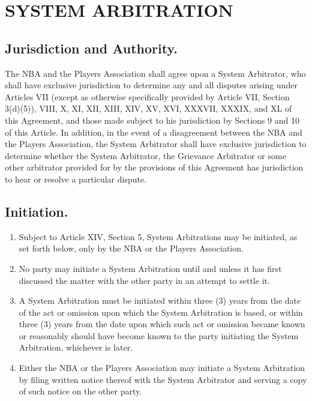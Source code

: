 \documentclass[
]{book}
\providecommand{\tightlist}{%
  \setlength{\itemsep}{0pt}\setlength{\parskip}{0pt}}
\begin{document}
\hypertarget{system-arbitration}{%
\chapter{SYSTEM ARBITRATION}\label{system-arbitration}}

\hypertarget{jurisdiction-and-authority.}{%
\section{Jurisdiction and Authority.}\label{jurisdiction-and-authority.}}

The NBA and the Players Association shall agree upon a System Arbitrator, who shall have exclusive jurisdiction to determine any and all disputes arising under Articles VII (except as otherwise specifically provided by Article VII, Section 3(d)(5)), VIII, X, XI, XII, XIII, XIV, XV, XVI, XXXVII, XXXIX, and XL of this Agreement, and those made subject to his jurisdiction by Sections 9 and 10 of this Article. In addition, in the event of a disagreement between the NBA and the Players Association, the System Arbitrator shall have exclusive jurisdiction to determine whether the System Arbitrator, the Grievance Arbitrator or some other arbitrator provided for by the provisions of this Agreement has jurisdiction to hear or resolve a particular dispute.

\hypertarget{initiation.-1}{%
\section{Initiation.}\label{initiation.-1}}

\begin{enumerate}
\def\labelenumi{(\alph{enumi})}
\tightlist
\item
  Subject to Article XIV, Section 5, System Arbitrations may be initiated, as set forth below, only by the NBA or the Players Association.
\item
  No party may initiate a System Arbitration until and unless it has first discussed the matter with the other party in an attempt to settle it.
\item
  A System Arbitration must be initiated within three (3) years from the date of the act or omission upon which the System Arbitration is based, or within three (3) years from the date upon which such act or omission became known or reasonably should have become known to the party initiating the System Arbitration, whichever is later.
\item
  Either the NBA or the Players Association may initiate a System Arbitration by filing written notice thereof with the System Arbitrator and serving a copy of such notice on the other party.
\end{enumerate}
\end{document}
